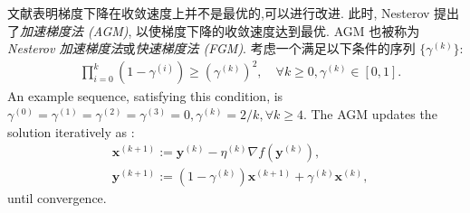 \documentclass[lang=cn,10pt]{gorgeousnbook}
\numberwithin{equation}{section}%
\numberwithin{figure}{section}%
\begin{document}
文献表明梯度下降在收敛速度上并不是最优的,可以进行改进. 此时, Nesterov 提出了\textit{加速梯度法 (AGM)}, 以使梯度下降的收敛速度达到最优. AGM 也被称为\textit{Nesterov 加速梯度法}或\textit{快速梯度法 (FGM)}.
考虑一个满足以下条件的序列 $\{\gamma^{(k)}\}$:
\begin{align}
& \prod_{i=0}^k (1 - \gamma^{(i)}) \geq (\gamma^{(k)})^2, \quad \forall k \geq 0, \gamma^{(k)} \in [0,1].
\end{align}
An example sequence, satisfying this condition, is $\gamma^{(0)} = \gamma^{(1)} = \gamma^{(2)} = \gamma^{(3)} = 0, \gamma^{(k)} = 2/k, \forall k \geq 4$.
The AGM updates the solution iteratively as \cite{nesterov1983method}:
\begin{align}
& \boldsymbol{x}^{(k+1)} := \boldsymbol{y}^{(k)} - \eta^{(k)} \nabla f(\boldsymbol{y}^{(k)}), \\
& \boldsymbol{y}^{(k+1)} := (1 - \gamma^{(k)}) \boldsymbol{x}^{(k+1)} + \gamma^{(k)} \boldsymbol{x}^{(k)},
\end{align}
until convergence.
\end{document}

